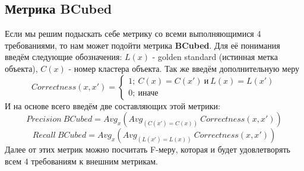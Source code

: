 \documentclass[12pt,fleqn]{article}
\begin{document}
\subsection{Метрика BCubed}
Если мы решим подыскать себе метрику со всеми выполняющимися 4 требованиями, то нам может подойти метрика {\bf BCubed}. Для её понимания введём следующие обозначения: $L(x)$ - golden standard (истинная метка объекта), $C(x)$ - номер кластера объекта. Так же введём дополнительную меру 
$$Correctness(x,x')=
	\begin{cases}
	1;~C(x)=C(x')~\text{и}~L(x)=L(x') \\
	0;~\text{иначе}
	\end{cases}$$ 
И на основе всего введём две составляющих этой метрики:
\begin{equation*}
	Precision~BCubed = Avg_x(Avg_{(C(x')=C(x))}~Correctness(x,x'))
\end{equation*}
\begin{equation*}
	Recall~BCubed = Avg_x(Avg_{(L(x')=L(x))}~Correctness(x,x'))
\end{equation*}
Далее от этих метрик можно посчитать F-меру, которая и будет удовлетворять всем 4 требованиям к внешним метрикам.
\end{document}
